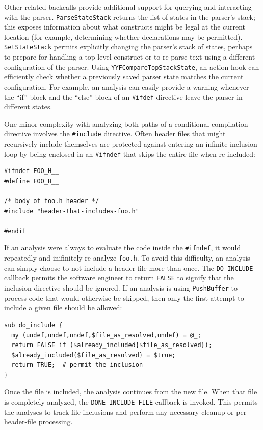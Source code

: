 \documentclass{article}
\newcommand{\ppd}[1]{\texttt{\##1}}
\newcommand{\file}[1]{{\small \texttt{#1}}}
\begin{document}
Other related backcalls provide additional support for querying and
interacting with the parser.  \texttt{ParseStateStack} returns the
list of states in the parser's stack; this exposes information about what
constructs might be legal at the current location (for example,
determining whether declarations may be permitted).
\texttt{SetStateStack} permits explicitly changing the parser's stack
of states, perhaps to prepare for handling a top level construct or to
re-parse text using a different configuration of the parser.  Using
\texttt{YYFCompareTopStackState}, an action hook can efficiently check
whether a previously saved parser state matches the current
configuration.  For example, an analysis can easily provide a warning
whenever the ``if'' block and the ``else'' block of an \ppd{ifdef}
directive leave the parser in different states.

One minor complexity with analyzing both paths of a conditional
compilation directive involves the \ppd{include} directive.  Often
header files that might recursively include themselves are protected
against entering an infinite inclusion loop by being enclosed in an
\ppd{ifndef} that skips the entire file when re-included:

\begin{verbatim}
#ifndef FOO_H__
#define FOO_H__

/* body of foo.h header */
#include "header-that-includes-foo.h"

#endif
\end{verbatim}

If an analysis were always to evaluate the code inside the \ppd{ifndef},
it would repeatedly and inifinitely re-analyze \file{foo.h}.  To avoid
this difficulty, an analysis can simply choose to not include a header file more
than once.  The \texttt{DO\_INCLUDE} callback permits the software
engineer to return \texttt{FALSE} to signify that the inclusion
directive should be ignored.  If an analysis is using
\texttt{PushBuffer} to process code that would otherwise be skipped,
then only the first attempt to include a given file should be allowed:

\begin{verbatim}
sub do_include { 
  my (undef,undef,undef,$file_as_resolved,undef) = @_;
  return FALSE if ($already_included{$file_as_resolved});
  $already_included{$file_as_resolved} = $true;
  return TRUE;  # permit the inclusion
}
\end{verbatim}

Once the file is included, the analysis continues from the new file.
When that file is completely analyzed, the \texttt{DONE\_INCLUDE\_FILE}
callback is invoked.  This permits the analyses to track file inclusions 
and perform any necessary cleanup or per-header-file processing.
\end{document}

